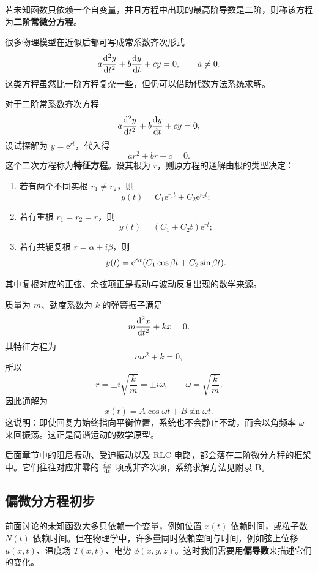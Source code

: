 \begin{definition}
若未知函数只依赖一个自变量，并且方程中出现的最高阶导数是二阶，则称该方程为\textbf{二阶常微分方程}。
\end{definition}

很多物理模型在近似后都可写成常系数齐次形式
\[
  a\dv[2]{y}{t}+b\dv{y}{t}+cy=0,\qquad a\ne 0.
\]
这类方程虽然比一阶方程复杂一些，但仍可以借助代数方法系统求解。

\begin{theorem}[特征方程法]
对于二阶常系数齐次方程
\[
  a\dv[2]{y}{t}+b\dv{y}{t}+cy=0,
\]
设试探解为 $y=\mathrm{e}^{rt}$，代入得
\[
  ar^2+br+c=0.
\]
这个二次方程称为\textbf{特征方程}。设其根为 $r$，则原方程的通解由根的类型决定：
\begin{enumerate}
  \item 若有两个不同实根 $r_1\ne r_2$，则
  \[
    y(t)=C_1\mathrm{e}^{r_1 t}+C_2\mathrm{e}^{r_2 t};
  \]
  \item 若有重根 $r_1=r_2=r$，则
  \[
    y(t)=(C_1+C_2 t)\mathrm{e}^{rt};
  \]
  \item 若有共轭复根 $r=\alpha\pm i\beta$，则
  \[
    y(t)=\mathrm{e}^{\alpha t}\qty(C_1\cos \beta t+C_2\sin \beta t).
  \]
\end{enumerate}
其中复根对应的正弦、余弦项正是振动与波动反复出现的数学来源。
\end{theorem}

\begin{example}[简谐振子]
质量为 $m$、劲度系数为 $k$ 的弹簧振子满足
\[
  m\dv[2]{x}{t}+kx=0.
\]
其特征方程为
\[
  mr^2+k=0,
\]
所以
\[
  r=\pm i\sqrt{\frac{k}{m}}=\pm i\omega,
  \qquad \omega=\sqrt{\frac{k}{m}}.
\]
因此通解为
\[
  x(t)=A\cos \omega t+B\sin \omega t.
\]
这说明：即使回复力始终指向平衡位置，系统也不会静止不动，而会以角频率 $\omega$ 来回振荡。这正是简谐运动的数学原型。
\end{example}

\begin{remark}
后面章节中的阻尼振动、受迫振动以及 RLC 电路，都会落在二阶微分方程的框架中。它们往往对应非零的 $\dv{x}{t}$ 项或非齐次项，系统求解方法见附录 B。
\end{remark}

\subsection{偏微分方程初步}

前面讨论的未知函数大多只依赖一个变量，例如位置 $x(t)$ 依赖时间，或粒子数 $N(t)$ 依赖时间。但在物理学中，许多量同时依赖空间与时间，例如弦上位移 $u(x,t)$、温度场 $T(x,t)$、电势 $\phi(x,y,z)$。这时我们需要用\textbf{偏导数}来描述它们的变化。

